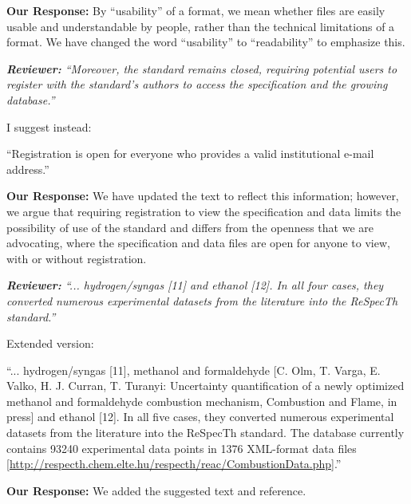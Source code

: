 \documentclass[a4paper,10pt]{elsarticle}
\newenvironment{reviewer}{\vspace{0.5\baselineskip}\begingroup\itshape\textbf{Reviewer:}}{\endgroup\vspace{0.5\baselineskip}}
\newenvironment{response}{\vspace{0.5\baselineskip}\textbf{Our Response:}}{\vspace{0.5\baselineskip}}
\begin{document}
\begin{response}
    By ``usability'' of a format, we mean whether files are easily usable and understandable by
    people, rather than the technical limitations of a format. We have changed the word
    ``usability'' to ``readability'' to emphasize this.
\end{response}

\begin{reviewer}
    ``Moreover, the standard remains closed, requiring potential users to register with the
    standard's authors to access the specification and the growing database.''

    I suggest instead:

    ``Registration is open for everyone who provides a valid institutional e-mail address.''
\end{reviewer}

\begin{response}
    We have updated the text to reflect this information; however, we argue that requiring
    registration to view the specification and data limits the possibility of use of the standard
    and differs from the openness that we are advocating, where the specification and data files are
    open for anyone to view, with or without registration.
\end{response}

\begin{reviewer}
    ``... hydrogen/syngas [11] and ethanol [12]. In all four cases, they converted numerous
    experimental datasets from the literature into the ReSpecTh standard.''

    Extended version:

    ``... hydrogen/syngas [11], methanol and formaldehyde [C. Olm, T. Varga, E. Valko, H. J. Curran,
    T. Turanyi: Uncertainty quantification of a newly optimized methanol and formaldehyde combustion
    mechanism, Combustion and Flame, in press] and ethanol [12]. In all five cases, they converted
    numerous experimental datasets from the literature into the ReSpecTh standard. The database
    currently contains  93240 experimental data points in 1376 XML-format data files
    [\url{http://respecth.chem.elte.hu/respecth/reac/CombustionData.php}].''
\end{reviewer}

\begin{response}
    We added the suggested text and reference.
\end{response}
\end{document}
